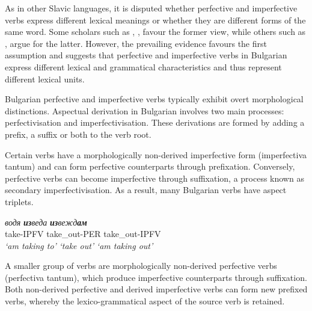 \documentclass[output=paper,colorlinks,citecolor=brown]{langscibook}
\begin{document}
As in other Slavic languages, it is disputed whether perfective and imperfective verbs express different lexical meanings or whether they are different forms of the same word. Some scholars such as \citet[137,193]{andreychin1944}, \citet[546]{kutsarov2007}, \citet[247]{Nitsolova2008} favour the former view, while others such as \citet[189]{Maslov}, \citet[8--9]{Stankov} argue for the latter. However, the prevailing evidence favours the first assumption and suggests that perfective and imperfective verbs in Bulgarian express different lexical and grammatical characteristics and thus represent different lexical units.

Bulgarian perfective and imperfective verbs typically exhibit overt morphological distinctions. Aspectual derivation in Bulgarian involves two main processes: perfectivisation and imperfectivisation. These derivations are formed by adding a prefix, a suffix or both to the verb root.

Certain verbs have a morphologically non-derived imperfective form (imperfectiva tantum) and can form perfective counterparts through prefixation. Conversely, perfective verbs can become imperfective through suffixation, a process known as secondary imperfectivisation. As a result, many Bulgarian verbs have aspect triplets.

 \begin{exe}
 \ex  \label{ch01:ex:23}
 \glll \textit{водя}   \hspace{0.4cm}  \textit{\textbf{из}веда}  \hspace{0.4cm} \textit{\textbf{из}вежд\textbf{ам}}\\
 take-IPFV  \hspace{0.4cm} take\_out-PER   \hspace{0.4cm} take\_out-IPFV \\
  \textit{`am taking to'}  \hspace{0.4cm} \textit{`take out'}  \hspace{0.4cm}   \textit{`am taking out'} \\
 \end{exe}
 
A smaller group of verbs are morphologically non-derived perfective verbs (perfectiva tantum), which produce imperfective counterparts through suffixation. Both non-derived perfective and derived imperfective verbs can form new prefixed verbs, whereby the lexico-grammatical aspect of the source verb is retained.
\end{document}
